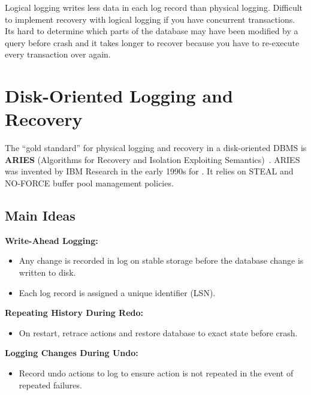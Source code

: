 \documentclass[11pt]{article}
\begin{document}
Logical logging writes less data in each log record than physical logging.
Difficult to implement recovery with logical logging if you have concurrent transactions.
Its hard to determine which parts of the database may have been modified by a query before 
crash and it takes longer to recover because you have to re-execute every transaction over again.

\section{Disk-Oriented Logging and Recovery}
The ``gold standard'' for physical logging and recovery in a  disk-oriented DBMS is 
\textbf{ARIES} (Algorithms for Recovery and Isolation Exploiting Semantics)~\cite{p94-mohan}.
ARIES was invented by IBM Research in the early 1990s for .
It relies on STEAL and NO-FORCE buffer pool management policies.

\subsection{Main Ideas}

\textbf{Write-Ahead Logging:}
\begin{itemize}
    \item
    Any change is recorded in log on stable storage before the database change is written 
    to disk.
    
    \item
    Each log record is assigned a unique identifier (LSN).
\end{itemize}

\textbf{Repeating History During Redo:}
\begin{itemize}
    \item
    On restart, retrace actions and restore database to exact state before crash.
\end{itemize}

\textbf{Logging Changes During Undo:}
\begin{itemize}
    \item
    Record undo actions to log to ensure action is not repeated in the event of repeated 
    failures.
\end{itemize}
\end{document}

